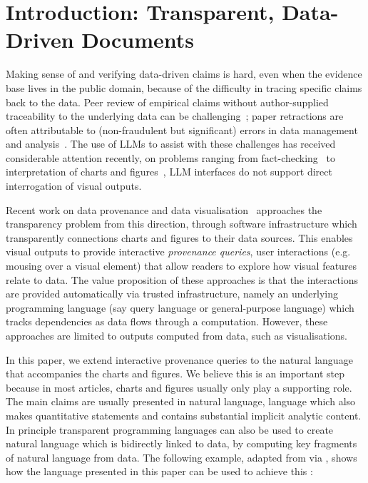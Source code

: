 \section{Introduction: Transparent, Data-Driven Documents}

Making sense of and verifying data-driven claims is hard, even when the evidence base lives in the public
domain, because of the difficulty in tracing specific claims back to the data. Peer review of empirical claims
without author-supplied traceability to the underlying data can be challenging~\citep{weber20}; paper
retractions are often attributable to (non-fraudulent but significant) errors in data management and
analysis~\citep{hu25}. The use of LLMs to assist with these challenges has received considerable attention
recently, on problems ranging from fact-checking~\citep{abu-ahmad25} to interpretation of charts and
figures~\citep{roberts24}, LLM interfaces do not support direct interrogation of visual outputs.

Recent work on data provenance and data visualisation~\citep{psallidas18smoke,perera22,bond25} approaches the
transparency problem from this direction, through software infrastructure which transparently connections
charts and figures to their data sources. 
This enables visual outputs to provide interactive \emph{provenance queries}, user interactions (e.g. mousing
over a visual element) that allow readers to explore how visual features relate to data. The value proposition
of these approaches is that the interactions are provided automatically via trusted infrastructure, namely an
underlying programming language (say query language or general-purpose language) which tracks dependencies as
data flows through a computation. However, these approaches are limited to outputs computed from data, such as
visualisations.

In this paper, we extend interactive provenance queries to the natural language that accompanies the charts
and figures. We believe this is an important step because in most articles, charts and figures usually only
play a supporting role. The main claims are usually presented in natural language, language which also makes
quantitative statements and contains substantial implicit analytic content. In principle transparent
programming languages can also be used to create natural language which is bidirectly linked to data, by
computing key fragments of natural language from data. The following example, adapted from \cite{zhang18} via
\cite{moosavi21}, shows how the language presented in this paper can be used to achieve this :

